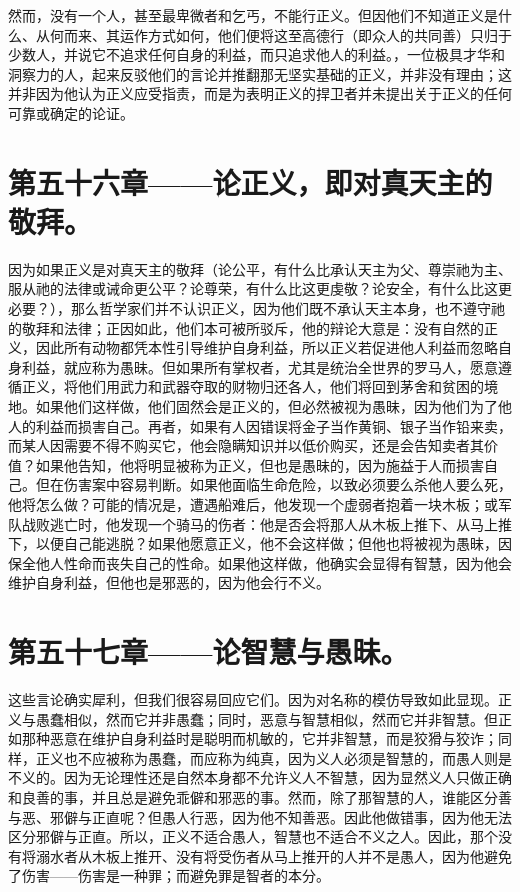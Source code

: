 然而，没有一个人，甚至最卑微者和乞丐，不能行正义。但因他们不知道正义是什么、从何而来、其运作方式如何，他们便将这至高德行（即众人的共同善）只归于少数人，并说它不追求任何自身的利益，而只追求他人的利益。，一位极具才华和洞察力的人，起来反驳他们的言论并推翻那无坚实基础的正义，并非没有理由；这并非因为他认为正义应受指责，而是为表明正义的捍卫者并未提出关于正义的任何可靠或确定的论证。\par


\section{第五十六章——论正义，即对真天主的敬拜。}

因为如果正义是对真天主的敬拜（论公平，有什么比承认天主为父、尊崇祂为主、服从祂的法律或诫命更公平？论尊荣，有什么比这更虔敬？论安全，有什么比这更必要？），那么哲学家们并不认识正义，因为他们既不承认天主本身，也不遵守祂的敬拜和法律；正因如此，他们本可被所驳斥，他的辩论大意是：没有自然的正义，因此所有动物都凭本性引导维护自身利益，所以正义若促进他人利益而忽略自身利益，就应称为愚昧。但如果所有掌权者，尤其是统治全世界的罗马人，愿意遵循正义，将他们用武力和武器夺取的财物归还各人，他们将回到茅舍和贫困的境地。如果他们这样做，他们固然会是正义的，但必然被视为愚昧，因为他们为了他人的利益而损害自己。再者，如果有人因错误将金子当作黄铜、银子当作铅来卖，而某人因需要不得不购买它，他会隐瞒知识并以低价购买，还是会告知卖者其价值？如果他告知，他将明显被称为正义，但也是愚昧的，因为施益于人而损害自己。但在伤害案中容易判断。如果他面临生命危险，以致必须要么杀他人要么死，他将怎么做？可能的情况是，遭遇船难后，他发现一个虚弱者抱着一块木板；或军队战败逃亡时，他发现一个骑马的伤者：他是否会将那人从木板上推下、从马上推下，以便自己能逃脱？如果他愿意正义，他不会这样做；但他也将被视为愚昧，因保全他人性命而丧失自己的性命。如果他这样做，他确实会显得有智慧，因为他会维护自身利益，但他也是邪恶的，因为他会行不义。\par


\section{第五十七章——论智慧与愚昧。}

这些言论确实犀利，但我们很容易回应它们。因为对名称的模仿导致如此显现。正义与愚蠢相似，然而它并非愚蠢；同时，恶意与智慧相似，然而它并非智慧。但正如那种恶意在维护自身利益时是聪明而机敏的，它并非智慧，而是狡猾与狡诈；同样，正义也不应被称为愚蠢，而应称为纯真，因为义人必须是智慧的，而愚人则是不义的。因为无论理性还是自然本身都不允许义人不智慧，因为显然义人只做正确和良善的事，并且总是避免乖僻和邪恶的事。然而，除了那智慧的人，谁能区分善与恶、邪僻与正直呢？但愚人行恶，因为他不知善恶。因此他做错事，因为他无法区分邪僻与正直。所以，正义不适合愚人，智慧也不适合不义之人。因此，那个没有将溺水者从木板上推开、没有将受伤者从马上推开的人并不是愚人，因为他避免了伤害——伤害是一种罪；而避免罪是智者的本分。\par

